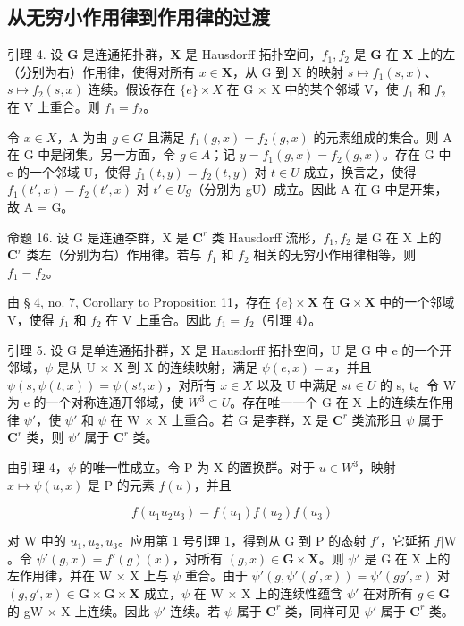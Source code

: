 \subsection{从无穷小作用律到作用律的过渡}

引理 4. 设 \(\mathbf{G}\) 是连通拓扑群，\(\mathbf{X}\) 是 Hausdorff 拓扑空间，\(f_{1}, f_{2}\) 是 \(\mathbf{G}\) 在 \(\mathbf{X}\) 上的左（分别为右）作用律，使得对所有 \(x \in \mathbf{X}\)，从 G 到 X 的映射 \(s \mapsto f_1(s, x)\)、\(s \mapsto f_2(s, x)\) 连续。假设存在 \(\{e\} \times X\) 在 G \(\times\) X 中的某个邻域 V，使 \(f_1\) 和 \(f_2\) 在 V 上重合。则 \(f_1 = f_2\)。

令 \(x \in X\)，A 为由 \(g \in G\) 且满足 \(f_{1}(g, x) = f_{2}(g, x)\) 的元素组成的集合。则 A 在 G 中是闭集。另一方面，令 \(g \in A\)；记 \(y = f_{1}(g, x) = f_{2}(g, x)\)。存在 G 中 e 的一个邻域 U，使得 \(f_{1}(t, y) = f_{2}(t, y)\) 对 \(t \in U\) 成立，换言之，使得 \(f_{1}(t', x) = f_{2}(t', x)\) 对 \(t' \in Ug\)（分别为 gU）成立。因此 A 在 G 中是开集，故 A = G。

命题 16. 设 G 是连通李群，X 是 \(\mathbf{C}^r\) 类 Hausdorff 流形，\(f_1, f_2\) 是 G 在 X 上的 \(\mathbf{C}^r\) 类左（分别为右）作用律。若与 \(f_1\) 和 \(f_2\) 相关的无穷小作用律相等，则 \(f_1 = f_2\)。

由 § 4, no. 7, Corollary to Proposition 11，存在 \(\{e\} \times \mathbf{X}\) 在 \(\mathbf{G} \times \mathbf{X}\) 中的一个邻域 V，使得 \(f_{1}\) 和 \(f_{2}\) 在 V 上重合。因此 \(f_{1} = f_{2}\)（引理 4）。

引理 5. 设 G 是单连通拓扑群，X 是 Hausdorff 拓扑空间，U 是 G 中 e 的一个开邻域，\(\psi\) 是从 U × X 到 X 的连续映射，满足 \(\psi(e, x) = x\)，并且 \(\psi(s, \psi(t, x)) = \psi(st, x)\)，对所有 \(x \in X\) 以及 U 中满足 \(st \in U\) 的 s, t。令 W 为 e 的一个对称连通开邻域，使 \(W^{3} \subset U\)。存在唯一一个 G 在 X 上的连续左作用律 \(\psi'\)，使 \(\psi'\) 和 \(\psi\) 在 W × X 上重合。若 G 是李群，X 是 \(\mathbf{C}^r\) 类流形且 \(\psi\) 属于 \(\mathbf{C}^r\) 类，则 \(\psi'\) 属于 \(\mathbf{C}^r\) 类。

由引理 4，\(\psi\) 的唯一性成立。令 P 为 X 的置换群。对于 \(u \in W^{3}\)，映射 \(x \mapsto \psi(u, x)\) 是 P 的元素 \(f(u)\)，并且

\[
f \left(u _ {1} u _ {2} u _ {3}\right) = f \left(u _ {1}\right) f \left(u _ {2}\right) f \left(u _ {3}\right)
\]

对 W 中的 \(u_{1}, u_{2}, u_{3}\)。应用第 1 号引理 1，得到从 G 到 P 的态射 \(f'\)，它延拓 \(f|\mathrm{W}\)。令 \(\psi'(g,x)=f'(g)(x)\)，对所有 \((g,x)\in\mathbf{G}\times\mathbf{X}\)。则 \(\psi'\) 是 G 在 X 上的左作用律，并在 W × X 上与 \(\psi\) 重合。由于 \(\psi'(g,\psi'(g',x))=\psi'(gg',x)\) 对 \((g,g',x)\in\mathbf{G}\times\mathbf{G}\times\mathbf{X}\) 成立，\(\psi\) 在 W × X 上的连续性蕴含 \(\psi'\) 在对所有 \(g\in\mathbf{G}\) 的 gW × X 上连续。因此 \(\psi'\) 连续。若 \(\psi\) 属于 \(\mathbf{C}^r\) 类，同样可见 \(\psi'\) 属于 \(\mathbf{C}^r\) 类。

